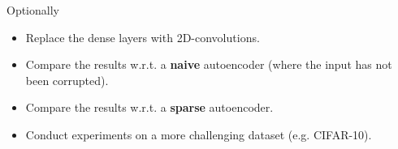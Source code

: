 \documentclass[aspectratio=169]{beamer}
\begin{document}
\begin{frame}{Optionally}
\begin{itemize}
\item Replace the dense layers with 2D-convolutions.
\item Compare the results w.r.t. a \textbf{naive} autoencoder (where the input has not been corrupted).
\item Compare the results w.r.t. a \textbf{sparse} autoencoder.
\item Conduct experiments on a more challenging dataset (e.g. CIFAR-10). 
\end{itemize}
\end{frame}


\begin{frame}{\ }
\end{frame}

\end{document}
